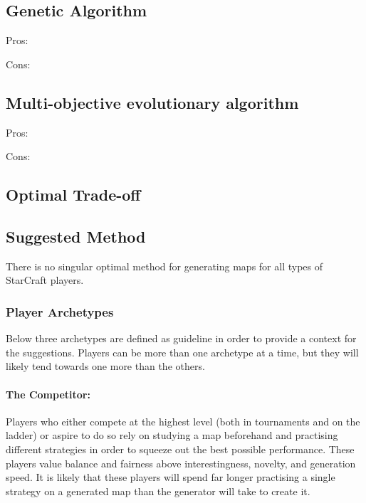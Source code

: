 \subsection{Genetic Algorithm}
\label{discussion_comparison_geneticalgorithm}
Pros:
\begin{my_itemize}
\item
\item
\end{my_itemize}
Cons:
\begin{my_itemize}
\item
\item
\end{my_itemize}

\subsection{Multi-objective evolutionary algorithm}
\label{discussion_comparison_moea}
Pros:
\begin{my_itemize}
\item
\item
\end{my_itemize}
Cons:
\begin{my_itemize}
\item
\item
\end{my_itemize}

\subsection{Optimal Trade-off}

\subsection{Suggested Method}
There is no singular optimal method for generating maps for all types of StarCraft players. 

\subsubsection{Player Archetypes}
Below three archetypes are defined as guideline in order to provide a context for the suggestions. Players can be more than one archetype at a time, but they will likely tend towards one more than the others.

\paragraph{The Competitor:} Players who either compete at the highest level (both in tournaments and on the ladder) or aspire to do so rely on studying a map beforehand and practising different strategies in order to squeeze out the best possible performance. These players value balance and fairness above interestingness, novelty, and generation speed. It is likely that these players will spend far longer practising a single strategy on a generated map than the generator will take to create it.

